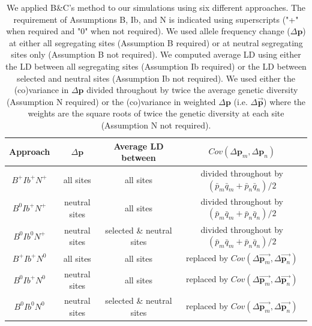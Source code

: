 \documentclass[12pt]{article}
\providecommand{\DIFdelbegin}{} %
\providecommand{\DIFaddbeginFL}{} %
\providecommand{\DIFaddendFL}{} %
\providecommand{\DIFdelbeginFL}{} %
\providecommand{\DIFdelendFL}{} %
\newcommand{\DIFscaledelfig}{0.5}
\newlength{\DIFdelgraphicswidth} %
\newlength{\DIFdelgraphicsheight} %
\newcommand{\DIFaddincludegraphics}[2][]{{\color{blue}\fbox{\DIFOincludegraphics[#1]{#2}}}} %
\newcommand{\DIFdelincludegraphics}[2][]{%
\sbox{\DIFdelgraphicsbox}{\DIFOincludegraphics[#1]{#2}}%
\settoboxwidth{\DIFdelgraphicswidth}{\DIFdelgraphicsbox} %
\settoboxtotalheight{\DIFdelgraphicsheight}{\DIFdelgraphicsbox} %
\scalebox{\DIFscaledelfig}{%
\parbox[b]{\DIFdelgraphicswidth}{\usebox{\DIFdelgraphicsbox}\\[-\baselineskip] \rule{\DIFdelgraphicswidth}{0em}}\llap{\resizebox{\DIFdelgraphicswidth}{\DIFdelgraphicsheight}{%
\setlength{\unitlength}{\DIFdelgraphicswidth}%
\begin{picture}(1,1)%
\thicklines\linethickness{2pt} %
{\color[rgb]{1,0,0}\put(0,0){\framebox(1,1){}}}%
{\color[rgb]{1,0,0}\put(0,0){\line( 1,1){1}}}%
{\color[rgb]{1,0,0}\put(0,1){\line(1,-1){1}}}%
\end{picture}%
}\hspace*{3pt}}} %
} %
\DeclareRobustCommand{\DIFdelbegin}{\DIFOdelbegin \let\includegraphics\DIFdelincludegraphics} %
\DeclareRobustCommand{\DIFaddbeginFL}{\DIFOaddbeginFL \let\includegraphics\DIFaddincludegraphics} %
\DeclareRobustCommand{\DIFaddendFL}{\DIFOaddendFL \let\includegraphics\DIFOincludegraphics} %
\DeclareRobustCommand{\DIFdelbeginFL}{\DIFOdelbeginFL \let\includegraphics\DIFdelincludegraphics} %
\DeclareRobustCommand{\DIFdelendFL}{\DIFOaddendFL \let\includegraphics\DIFOincludegraphics} %
\begin{document}
\begin{bibunit}
\DIFdelbegin %
\DIFdelendFL \DIFaddbeginFL \begin{table}[H]
    \DIFaddendFL \centering
    \begin{tabular}{|c|c|c|c|}
    \hline
        Approach & $\Delta\textbf{p}$ & Average LD between &  $Cov(\Delta\textbf{p}_m,\Delta\textbf{p}_n)$  \\
         \hline
         $B^+Ib^+N^+$&all sites&all sites&divided throughout by ${(\bar{p}_m\bar{q}_m + \bar{p}_n\bar{q}_n )/2}$\\
         $B^0Ib^+N^+$&neutral sites&all sites&divided throughout by ${(\bar{p}_m\bar{q}_m + \bar{p}_n\bar{q}_n )/2}$\\
         $B^0Ib^0N^+$&neutral sites&selected \& neutral sites&divided throughout by ${(\bar{p}_m\bar{q}_m + \bar{p}_n\bar{q}_n )/2}$\\
         $B^+Ib^+N^0$&all sites&all sites&replaced by $Cov(\Delta\overrightarrow{\textbf{p}_m},\Delta\overrightarrow{\textbf{p}_n})$\\
         $B^0Ib^+N^0$&neutral sites&all sites&replaced by $Cov(\Delta\overrightarrow{\textbf{p}_m},\Delta\overrightarrow{\textbf{p}_n})$\\
         $B^0Ib^0N^0$&neutral sites&selected \& neutral sites&replaced by $Cov(\Delta\overrightarrow{\textbf{p}_m},\Delta\overrightarrow{\textbf{p}_n})$\\
         \hline
    \end{tabular}
    \caption{We applied B\&C's method to our simulations using six different approaches. The requirement of Assumptions B, Ib, and N is indicated using superscripts ("+" when required and "0" when not required). We used allele frequency change ($\Delta\textbf{p}$) at either all segregating sites (Assumption B required) or at neutral segregating sites only (Assumption B not required). We computed average LD using either the LD between all segregating sites (Assumption Ib required) or the LD between selected and neutral sites (Assumption Ib not required). We used either the (co)variance in $\Delta\textbf{p}$ divided throughout by twice the average genetic diversity (Assumption N required) or the (co)variance in weighted $\Delta\textbf{p}$ (i.e. $\Delta\overrightarrow{\textbf{p}}$) where the weights are the square roots of twice the genetic diversity at each site (Assumption N not required).}
    \DIFdelbeginFL %
\DIFdelendFL \DIFaddbeginFL \label{tab:BC_approaches}
\DIFaddendFL \end{table}



\end{bibunit}
\end{document}
